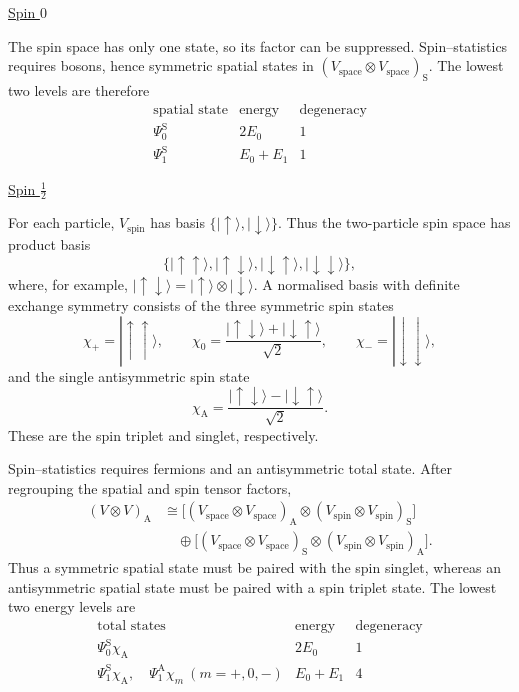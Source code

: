 \documentclass[11pt,a4paper]{article}
\begin{document}
\medskip
\noindent
\underline{Spin $0$}

The spin space has only one state, so its factor can be suppressed.
Spin--statistics requires bosons, hence symmetric spatial states in
$(V_{\mathrm{space}}\otimes V_{\mathrm{space}})_{\mathrm{S}}$.
The lowest two levels are therefore
\[
    \begin{array}{c|c|c}
        \text{spatial state} & \text{energy} & \text{degeneracy}\\ \hline
        \Psi_0^{\mathrm{S}} & 2E_0 & 1\\
        \Psi_1^{\mathrm{S}} & E_0+E_1 & 1
    \end{array}
\]

\medskip
\noindent
\underline{Spin $\tfrac12$}

For each particle, $V_{\mathrm{spin}}$ has basis
$\{|\uparrow\rangle,|\downarrow\rangle\}$. Thus the two-particle
spin space has product basis
\[
    \{|\uparrow\uparrow\rangle,
      |\uparrow\downarrow\rangle,
      |\downarrow\uparrow\rangle,
      |\downarrow\downarrow\rangle\},
\]
where, for example,
$|\uparrow\downarrow\rangle=|\uparrow\rangle\otimes|\downarrow\rangle$.
A normalised basis with definite exchange symmetry consists of the
three symmetric spin states
\[
    \chi_+=|\uparrow\uparrow\rangle,\qquad
    \chi_0=\frac{|\uparrow\downarrow\rangle
                     +|\downarrow\uparrow\rangle}{\sqrt{2}},\qquad
    \chi_-=|\downarrow\downarrow\rangle,
\]
and the single antisymmetric spin state
\[
    \chi_{\mathrm{A}}
       =\frac{|\uparrow\downarrow\rangle
                     -|\downarrow\uparrow\rangle}{\sqrt{2}}.
\]
These are the spin triplet and singlet, respectively.

Spin--statistics requires fermions and an antisymmetric total state.
After regrouping the spatial and spin tensor factors,
\begin{align*}
    (V\otimes V)_{\mathrm{A}}
    &\cong
    \bigl[(V_{\mathrm{space}}\otimes V_{\mathrm{space}})_{\mathrm{A}}
       \otimes(V_{\mathrm{spin}}\otimes V_{\mathrm{spin}})_{\mathrm{S}}\bigr]\\
    &\quad\oplus
    \bigl[(V_{\mathrm{space}}\otimes V_{\mathrm{space}})_{\mathrm{S}}
       \otimes(V_{\mathrm{spin}}\otimes V_{\mathrm{spin}})_{\mathrm{A}}\bigr].
\end{align*}
Thus a symmetric spatial state must be paired with the spin singlet,
whereas an antisymmetric spatial state must be paired with a spin
triplet state. The lowest two energy levels are
\[
    \begin{array}{c|c|c}
        \text{total states} & \text{energy} & \text{degeneracy}\\ \hline
        \Psi_0^{\mathrm{S}}\chi_{\mathrm{A}}
            & 2E_0 & 1\\[3pt]
        \Psi_1^{\mathrm{S}}\chi_{\mathrm{A}},\quad
        \Psi_1^{\mathrm{A}}\chi_m\ (m=+,0,-)
            & E_0+E_1 & 4
    \end{array}
\]
\end{document}
